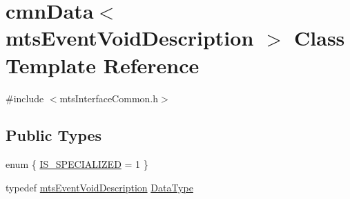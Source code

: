 \hypertarget{classcmn_data_3_01mts_event_void_description_01_4}{\section{cmn\-Data$<$ mts\-Event\-Void\-Description $>$ Class Template Reference}
\label{classcmn_data_3_01mts_event_void_description_01_4}
}


{\ttfamily \#include $<$mts\-Interface\-Common.\-h$>$}

\subsection*{Public Types}
\begin{DoxyCompactItemize}
\item 
enum \{ \hyperlink{classcmn_data_3_01mts_event_void_description_01_4_a40ed88ad4390d65cb78e0bbd37058585a8f4c9213f90aafa7f2994e431f5d9418}{I\-S\-\_\-\-S\-P\-E\-C\-I\-A\-L\-I\-Z\-E\-D} = 1
 \}
\item 
typedef \hyperlink{classmts_event_void_description}{mts\-Event\-Void\-Description} \hyperlink{classcmn_data_3_01mts_event_void_description_01_4_ae99d827ac01b4f0ef589606af2924260}{Data\-Type}
\end{DoxyCompactItemize}
